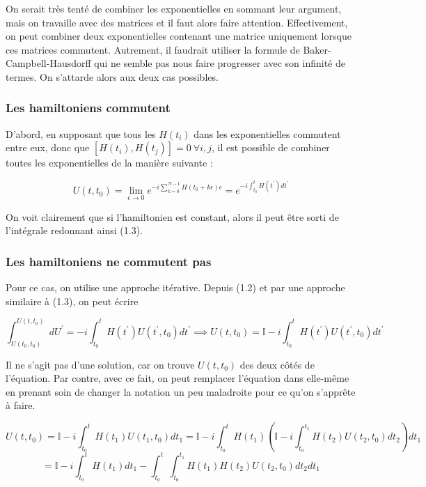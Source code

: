On serait très tenté de combiner les exponentielles en sommant leur argument, mais on travaille avec des matrices et il faut alors faire attention. Effectivement, on peut combiner deux exponentielles contenant une matrice uniquement lorsque ces matrices commutent. Autrement, il faudrait utiliser la formule de Baker-Campbell-Hausdorff qui ne semble pas nous faire progresser avec son infinité de termes. On s'attarde alors aux deux cas possibles.

\subsubsection{Les hamiltoniens commutent}

D'abord, en supposant que tous les $H(t_i)$ dans les exponentielles commutent entre eux, donc que $\left[H(t_i), H(t_j)\right] = 0 \ \forall i,j$, il est possible de combiner toutes les exponentielles de la manière suivante :

\begin{equation}
    U(t,t_0) = \lim_{\epsilon \rightarrow 0} e^{-i \sum_{k=0}^{N-1}H(t_0 + k\epsilon)\epsilon} = e^{-i\int_{t_0}^{t}H(t^{'})dt^{'}}
\end{equation}

On voit clairement que si l'hamiltonien est constant, alors il peut être sorti de l'intégrale redonnant ainsi (1.3).

\subsubsection{Les hamiltoniens ne commutent pas}
Pour ce cas, on utilise une approche itérative. Depuis (1.2) et par une approche similaire à (1.3), on peut écrire 

\begin{equation*}
    \int_{U(t_0,t_0)}^{U(t,t_0)}dU^{'} = -i \int_{t_0}^{t}H(t^{'})U(t^{'}, t_0)dt^{'} \implies U(t,t_0) = \mathbb{I} -i\int_{t_0}^{t}H(t^{'})U(t^{'},t_0)dt^{'}
\end{equation*}

Il ne s'agit pas d'une solution, car on trouve $U(t,t_0)$ des deux côtés de l'équation. Par contre, avec ce fait, on peut remplacer l'équation dans elle-même en prenant soin de changer la notation un peu maladroite pour ce qu'on s'apprête à faire.

\begin{equation*}
    U(t,t_0) = \mathbb{I} -i\int_{t_0}^{t}H(t_1)U(t_1,t_0)dt_1 = \mathbb{I} -i\int_{t_0}^{t}H(t_1)\left(\mathbb{I} - i\int_{t_0}^{t_1}H(t_2)U(t_2,t_0)dt_2\right)dt_1
\end{equation*}
\begin{equation*}
    = \mathbb{I} -i\int_{t_0}^{t}H(t_1)dt_1 - \int_{t_0}^{t}\int_{t_0}^{t_1}H(t_1)H(t_2)U(t_2,t_0)dt_2dt_1
\end{equation*}

